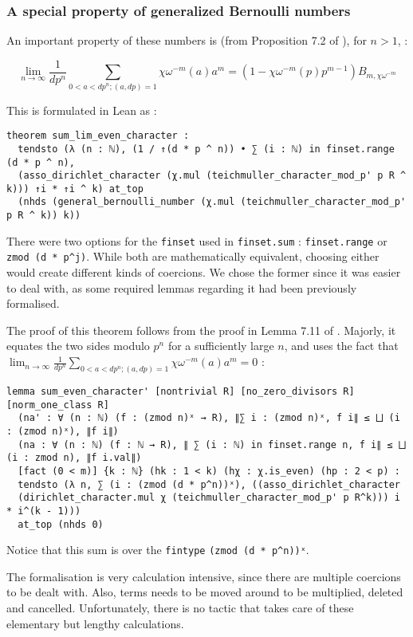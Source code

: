 \documentclass[a4paper,UKenglish,cleveref, autoref, thm-restate]{lipics-v2021}
\newcommand{\lean}[1]{\texttt{#1}\xspace} %
\begin{document}
\subsubsection{A special property of generalized Bernoulli numbers}
An important property of these numbers is (from Proposition 7.2 of \cite{cyc}), for $n > 1$, : 
\begin{theorem}\label{thm1}
$$ \lim_{n \to \infty} \frac{1}{dp^{n}} \sum_{0 < a < dp^{n} ; (a, dp) = 1} \chi \omega^{-m} (a) a^{m} = 
(1 - \chi \omega^{-m} (p) p^{m-1}) B_{m, \chi \omega^{-m}} $$
\end{theorem} 
This is formulated in Lean as :
\begin{lstlisting}
theorem sum_lim_even_character : 
  tendsto (λ (n : ℕ), (1 / ↑(d * p ^ n)) • ∑ (i : ℕ) in finset.range (d * p ^ n),
  (asso_dirichlet_character (χ.mul (teichmuller_character_mod_p' p R ^ k))) ↑i * ↑i ^ k) at_top
  (nhds (general_bernoulli_number (χ.mul (teichmuller_character_mod_p' p R ^ k)) k))
\end{lstlisting}
There were two options for the \lean{finset} used in \lean{finset.sum} : \lean{finset.range} or \lean{zmod (d * p\textasciicircum j)}. 
While both are mathematically equivalent, choosing either would create different kinds of coercions. 
We chose the former since it was easier to deal with, as some required lemmas regarding it had been previously formalised.

The proof of this theorem follows from the proof in Lemma 7.11 of \cite{cyc}. Majorly, it equates the two sides modulo $p^n$ for a 
sufficiently large $n$, and uses the fact that $ \lim_{n \to \infty} \frac{1}{dp^{n}} \sum_{0 < a < dp^{n} ; (a, dp) = 1} \chi \omega^{-m} (a) a^{m} = 0 $ :
\begin{lstlisting}
lemma sum_even_character' [nontrivial R] [no_zero_divisors R] [norm_one_class R]
  (na' : ∀ (n : ℕ) (f : (zmod n)ˣ → R), ∥∑ i : (zmod n)ˣ, f i∥ ≤ ⨆ (i : (zmod n)ˣ), ∥f i∥)
  (na : ∀ (n : ℕ) (f : ℕ → R), ∥ ∑ (i : ℕ) in finset.range n, f i∥ ≤ ⨆ (i : zmod n), ∥f i.val∥)
  [fact (0 < m)] {k : ℕ} (hk : 1 < k) (hχ : χ.is_even) (hp : 2 < p) :
  tendsto (λ n, ∑ (i : (zmod (d * p^n))ˣ), ((asso_dirichlet_character
  (dirichlet_character.mul χ (teichmuller_character_mod_p' p R^k))) i * i^(k - 1))) 
  at_top (nhds 0) 
\end{lstlisting}
Notice that this sum is over the \lean{fintype} \lean{(zmod (d * p\textasciicircum n))ˣ}.

The formalisation is very calculation intensive, since there are multiple 
coercions to be dealt with. Also, terms needs to be moved around to be multiplied, deleted and cancelled. Unfortunately, there is no tactic 
that takes care of these elementary but lengthy calculations.
\end{document}
